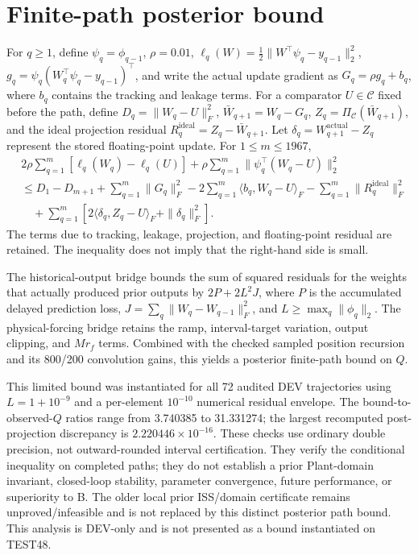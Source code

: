 \documentclass[11pt]{article}
\newcommand{\Cset}{\mathcal{C}}
\begin{document}
\section{Finite-path posterior bound}
For $q\geq1$, define $\psi_q=\phi_{q-1}$, $\rho=0.01$, $\ell_q(W)=\tfrac12\|W^\top\psi_q-y_{q-1}\|_2^2$, $g_q=\psi_q(W_q^\top\psi_q-y_{q-1})^\top$, and write the actual update gradient as $G_q=\rho g_q+b_q$, where $b_q$ contains the tracking and leakage terms. For a comparator $U\in\Cset$ fixed before the path, define $D_q=\|W_q-U\|_F^2$, $\bar W_{q+1}=W_q-G_q$, $Z_q=\Pi_{\Cset}(\bar W_{q+1})$, and the ideal projection residual $R_q^{\mathrm{ideal}}=Z_q-\bar W_{q+1}$. Let $\delta_q=W_{q+1}^{\mathrm{actual}}-Z_q$ represent the stored floating-point update. For $1\leq m\leq1967$,
\begin{equation}
\begin{aligned}
&2\rho\sum_{q=1}^{m}[\ell_q(W_q)-\ell_q(U)]
+\rho\sum_{q=1}^{m}\|\psi_q^\top(W_q-U)\|_2^2 \\
&\leq D_1-D_{m+1}+\sum_{q=1}^{m}\|G_q\|_F^2
-2\sum_{q=1}^{m}\langle b_q,W_q-U\rangle_F
-\sum_{q=1}^{m}\|R_q^{\mathrm{ideal}}\|_F^2 \\
&\quad+\sum_{q=1}^{m}\left[2\langle\delta_q,Z_q-U\rangle_F+\|\delta_q\|_F^2\right].
\end{aligned}
\label{eq:path-bound}
\end{equation}
The terms due to tracking, leakage, projection, and floating-point residual are retained. The inequality does not imply that the right-hand side is small.

The historical-output bridge bounds the sum of squared residuals for the weights that actually produced prior outputs by $2P+2L^2J$, where $P$ is the accumulated delayed prediction loss, $J=\sum_q\|W_q-W_{q-1}\|_F^2$, and $L\geq\max_q\|\phi_q\|_2$. The physical-forcing bridge retains the ramp, interval-target variation, output clipping, and $Mr_f$ terms. Combined with the checked sampled position recursion and its 800/200 convolution gains, this yields a posterior finite-path bound on $Q$.

This limited bound was instantiated for all 72 audited DEV trajectories using $L=1+10^{-9}$ and a per-element $10^{-10}$ numerical residual envelope. The bound-to-observed-$Q$ ratios range from 3.740385 to 31.331274; the largest recomputed post-projection discrepancy is $2.220446\times10^{-16}$. These checks use ordinary double precision, not outward-rounded interval certification. They verify the conditional inequality on completed paths; they do not establish a prior Plant-domain invariant, closed-loop stability, parameter convergence, future performance, or superiority to B. The older local prior ISS/domain certificate remains unproved/infeasible and is not replaced by this distinct posterior path bound. This analysis is DEV-only and is not presented as a bound instantiated on TEST48.
\end{document}
